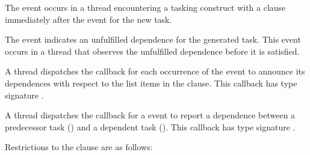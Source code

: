 The  event occurs in a thread encountering a
tasking construct with a  clause immediately after the
 event for the new task.

The  event indicates an unfulfilled dependence for the generated task.
This event occurs in a thread that observes the unfulfilled dependence before it is satisfied.

\tools

A thread dispatches the  callback
for each occurrence of the  event to
announce its dependences with respect to the list items in the  clause.
This callback has type signature
.

A thread dispatches the 
callback for a  event to report a
dependence between a predecessor task  () and a dependent task
().  This callback has type signature
.

\restrictions
Restrictions to the  clause are as follows:

